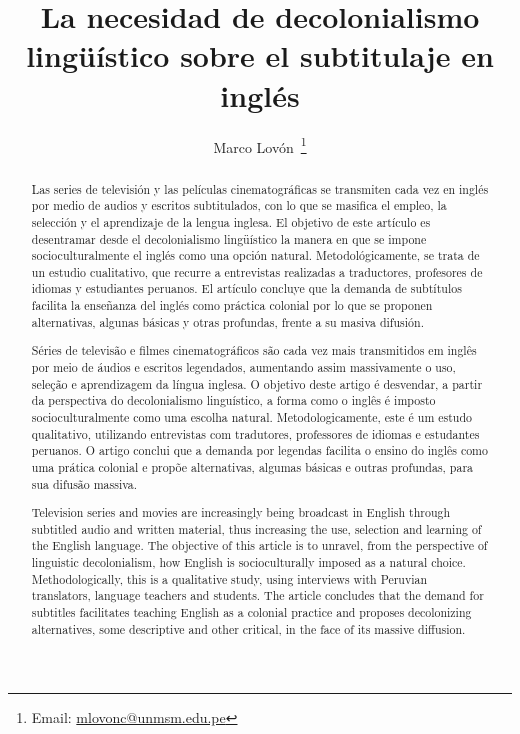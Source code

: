 \documentclass[spanish]{textolivre}
\title{La necesidad de decolonialismo lingüístico sobre el subtitulaje en inglés}
\author[1]{Marco Lovón~\orcid{0000-0002-9182-6072}\thanks{Email: \href{mlovonc@unmsm.edu.pe }{mlovonc@unmsm.edu.pe}}}
\affil[1]{Universidad Nacional Mayor de San Marcos, Lima, Perú.}
\begin{document}
\maketitle

\begin{polyabstract}
\begin{abstract}
Las series de televisión y las películas cinematográficas se transmiten cada vez en inglés por medio de audios y escritos subtitulados, con lo que se masifica el empleo, la selección y el aprendizaje de la lengua inglesa. El objetivo de este artículo es desentramar desde el decolonialismo lingüístico la manera en que se impone socioculturalmente el inglés como una opción natural. Metodológicamente, se trata de un estudio cualitativo, que recurre a entrevistas realizadas a traductores, profesores de idiomas y estudiantes peruanos. El artículo concluye que la demanda de subtítulos facilita la enseñanza del inglés como práctica colonial por lo que se proponen alternativas, algunas básicas y otras profundas, frente a su masiva difusión.

\end{abstract}

\begin{portuguese}
\begin{abstract}
    Séries de televisão e filmes cinematográficos são cada vez mais transmitidos em inglês por meio de áudios e escritos legendados, aumentando assim massivamente o uso, seleção e aprendizagem da língua inglesa. O objetivo deste artigo é desvendar, a partir da perspectiva do decolonialismo linguístico, a forma como o inglês é imposto socioculturalmente como uma escolha natural. Metodologicamente, este é um estudo qualitativo, utilizando entrevistas com tradutores, professores de idiomas e estudantes peruanos. O artigo conclui que a demanda por legendas facilita o ensino do inglês como uma prática colonial e propõe alternativas, algumas básicas e outras profundas, para sua difusão massiva.
    
\end{abstract}
\end{portuguese}

\begin{english}
\begin{abstract}
Television series and movies are increasingly being broadcast in English through subtitled audio and written material, thus increasing the use, selection and learning of the English language. The objective of this article is to unravel, from the perspective of linguistic decolonialism, how English is socioculturally imposed as a natural choice. Methodologically, this is a qualitative study, using interviews with Peruvian translators, language teachers and students. The article concludes that the demand for subtitles facilitates teaching English as a colonial practice and proposes decolonizing alternatives, some descriptive and other critical, in the face of its massive diffusion.


\end{abstract}
\end{english}
\end{polyabstract}
\end{document}
